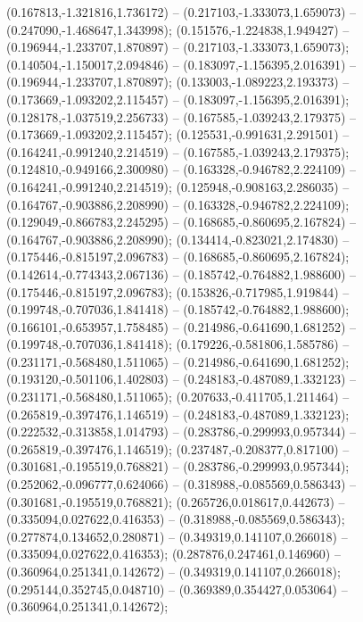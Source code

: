  (0.167813,-1.321816,1.736172) -- (0.217103,-1.333073,1.659073) -- (0.247090,-1.468647,1.343998);
 (0.151576,-1.224838,1.949427) -- (0.196944,-1.233707,1.870897) -- (0.217103,-1.333073,1.659073);
 (0.140504,-1.150017,2.094846) -- (0.183097,-1.156395,2.016391) -- (0.196944,-1.233707,1.870897);
 (0.133003,-1.089223,2.193373) -- (0.173669,-1.093202,2.115457) -- (0.183097,-1.156395,2.016391);
 (0.128178,-1.037519,2.256733) -- (0.167585,-1.039243,2.179375) -- (0.173669,-1.093202,2.115457);
 (0.125531,-0.991631,2.291501) -- (0.164241,-0.991240,2.214519) -- (0.167585,-1.039243,2.179375);
 (0.124810,-0.949166,2.300980) -- (0.163328,-0.946782,2.224109) -- (0.164241,-0.991240,2.214519);
 (0.125948,-0.908163,2.286035) -- (0.164767,-0.903886,2.208990) -- (0.163328,-0.946782,2.224109);
 (0.129049,-0.866783,2.245295) -- (0.168685,-0.860695,2.167824) -- (0.164767,-0.903886,2.208990);
 (0.134414,-0.823021,2.174830) -- (0.175446,-0.815197,2.096783) -- (0.168685,-0.860695,2.167824);
 (0.142614,-0.774343,2.067136) -- (0.185742,-0.764882,1.988600) -- (0.175446,-0.815197,2.096783);
 (0.153826,-0.717985,1.919844) -- (0.199748,-0.707036,1.841418) -- (0.185742,-0.764882,1.988600);
 (0.166101,-0.653957,1.758485) -- (0.214986,-0.641690,1.681252) -- (0.199748,-0.707036,1.841418);
 (0.179226,-0.581806,1.585786) -- (0.231171,-0.568480,1.511065) -- (0.214986,-0.641690,1.681252);
 (0.193120,-0.501106,1.402803) -- (0.248183,-0.487089,1.332123) -- (0.231171,-0.568480,1.511065);
 (0.207633,-0.411705,1.211464) -- (0.265819,-0.397476,1.146519) -- (0.248183,-0.487089,1.332123);
 (0.222532,-0.313858,1.014793) -- (0.283786,-0.299993,0.957344) -- (0.265819,-0.397476,1.146519);
 (0.237487,-0.208377,0.817100) -- (0.301681,-0.195519,0.768821) -- (0.283786,-0.299993,0.957344);
 (0.252062,-0.096777,0.624066) -- (0.318988,-0.085569,0.586343) -- (0.301681,-0.195519,0.768821);
 (0.265726,0.018617,0.442673) -- (0.335094,0.027622,0.416353) -- (0.318988,-0.085569,0.586343);
 (0.277874,0.134652,0.280871) -- (0.349319,0.141107,0.266018) -- (0.335094,0.027622,0.416353);
 (0.287876,0.247461,0.146960) -- (0.360964,0.251341,0.142672) -- (0.349319,0.141107,0.266018);
 (0.295144,0.352745,0.048710) -- (0.369389,0.354427,0.053064) -- (0.360964,0.251341,0.142672);

